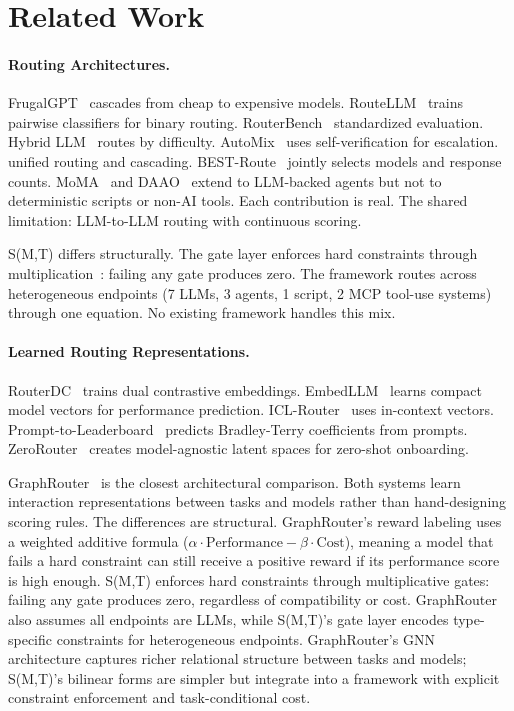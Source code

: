 \section{Related Work}
\label{sec:related}

\paragraph{Routing Architectures.}
FrugalGPT~\citep{chen2023frugalgpt} cascades from cheap to expensive models. RouteLLM~\citep{ong2024routellm} trains pairwise classifiers for binary routing. RouterBench~\citep{hu2024routerbench} standardized evaluation. Hybrid LLM~\citep{ding2024hybridllm} routes by difficulty. AutoMix~\citep{madaan2023automix} uses self-verification for escalation. \citet{dekoninck2024cascade} unified routing and cascading. BEST-Route~\citep{ding2025bestroute} jointly selects models and response counts. MoMA~\citep{moma2025routing} and DAAO~\citep{daao2025} extend to LLM-backed agents but not to deterministic scripts or non-AI tools. Each contribution is real. The shared limitation: LLM-to-LLM routing with continuous scoring.

S(M,T) differs structurally. The gate layer enforces hard constraints through multiplication~\citep{fishburn1967additive, train2009discrete}: failing any gate produces zero. The framework routes across heterogeneous endpoints (7 LLMs, 3 agents, 1 script, 2 MCP tool-use systems) through one equation. No existing framework handles this mix.

\paragraph{Learned Routing Representations.}
RouterDC~\citep{chen2024routerdc} trains dual contrastive embeddings. EmbedLLM~\citep{zhuang2024embedllm} learns compact model vectors for performance prediction. ICL-Router~\citep{wang2025iclrouter} uses in-context vectors. Prompt-to-Leaderboard~\citep{frick2025p2l} predicts Bradley-Terry coefficients from prompts. ZeroRouter~\citep{yan2026zerorouter} creates model-agnostic latent spaces for zero-shot onboarding.

GraphRouter~\citep{feng2024graphrouter} is the closest architectural comparison. Both systems learn interaction representations between tasks and models rather than hand-designing scoring rules. The differences are structural. GraphRouter's reward labeling uses a weighted additive formula ($\alpha \cdot \text{Performance} - \beta \cdot \text{Cost}$), meaning a model that fails a hard constraint can still receive a positive reward if its performance score is high enough. S(M,T) enforces hard constraints through multiplicative gates: failing any gate produces zero, regardless of compatibility or cost. GraphRouter also assumes all endpoints are LLMs, while S(M,T)'s gate layer encodes type-specific constraints for heterogeneous endpoints. GraphRouter's GNN architecture captures richer relational structure between tasks and models; S(M,T)'s bilinear forms are simpler but integrate into a framework with explicit constraint enforcement and task-conditional cost.

